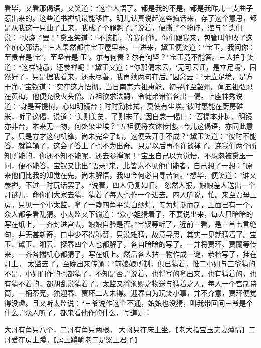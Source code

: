 \documentclass[12pt,oneside]{book}
\begin{document}
看毕，又看那偈语，又笑道：“这个人悟了。都是我的不是，都是我昨儿一支曲子惹出来的。这些道书禅机最能移性。明儿认真说起这些疯话来，存了这个意思，都是从我这一只曲子上来，我成了个罪魁了。”说着，便撕了个粉碎，递与丫头们说：“快烧了罢！”黛玉笑道：“不该撕，等我问他。你们跟我来，包管叫他收了这个痴心邪话。”
三人果然都往宝玉屋里来。一进来，黛玉便笑道：“宝玉，我问你：至贵者是‘宝’，至坚者是‘玉’。尔有何贵？尔有何坚？”宝玉竟不能答。三人拍手笑道：“这样钝愚，还参禅呢！”黛玉又道：“你那偈末云，‘无可云证，是立足境’，固然好了，只是据我看来，还未尽善。我再续两句在后。”因念云：“无立足境，是方干净。”宝钗道：“实在这方悟彻。当日南宗六祖惠能，初寻师至韶州。闻五祖弘忍在黄梅，他便充役火头僧。五祖欲求法嗣，令徒弟诸僧各出一偈。上座神秀说道：‘身是菩提树，心如明镜台；时时勤拂拭，莫使有尘埃。’彼时惠能在厨房碓米，听了这偈，说道：‘美则美矣，了则未了。’因自念一偈曰：‘菩提本非树，明镜亦非台，本来无一物，何处染尘埃？”五祖便将衣钵传他。今儿这偈语，亦同此意了。只是方才这句机锋，尚未完全了结，这便丢开手不成？“黛玉笑道：”彼时不能答，就算输了，这会子答上了也不为出奇。只是以后再不许谈禅了。连我们两个所知所能的，你还不知不能呢，还去参禅呢！“宝玉自己以为觉悟，不想忽被黛玉一问，便不能答，宝钗又比出”语录“来，此皆素不见他们能者。自己想了一想：”原来他们比我的知觉在先，尚未解悟，我如今何必自寻苦恼。“想毕，便笑道：”谁又参禅，不过一时玩话罢了。“说着，四人仍复如旧。
忽然人报，娘娘差人送出一个灯谜儿，命你们大家去猜，猜着了每人也作一个进去。四人听说，忙。来至贾母上房。只见一个小太监，拿了一盏四角平头白纱灯，专为灯谜而制，上面已有一个，众人都争看乱猜。小太监又下谕道：“众小姐猜着了，不要说出来，每人只暗暗的写在纸上，一齐封进宫去，娘娘自验是否。”宝钗等听了，近前一看，是一首七言绝句，并无甚新奇，口中少不得称赞，只说难猜，故意寻思，其实一见就猜着了。宝玉、黛玉、湘云、探春四个人也都解了，各自暗暗的写了。一并将贾环、贾蘭等传来，一齐各揣机心都猜了，写在纸上。然后各人拈一物作成一谜，恭楷写了，挂在灯上。
太监去了，至晚出来传谕：“前娘娘所制，俱已猜着，惟二小姐与三爷猜的不是。小姐们作的也都猜了，不知是否。”说着，也将写的拿出来。也有猜着的，也有猜不着的，都胡乱说猜着了。太监又将颁赐之物送与猜着之人，每人一个宫制诗筒，一柄茶筅，独迎春、贾环二人未得。迎春自为玩笑小事，并不介意，贾环便觉得没趣。且又听太监说：“三爷说作这个不通，娘娘也没猜，叫我带回问三爷是个什么。”众人听了，都来看他作的什么，写道是：

大哥有角只八个，二哥有角只两根。
大哥只在床上坐，【老大指宝玉夫妻薄情】二哥爱在房上蹲。【房上蹲喻老二是梁上君子】
\end{document}
